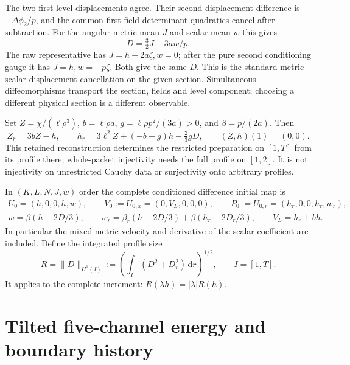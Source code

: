 \documentclass[11pt]{article}
\newcommand{\dd}{\mathrm d}
\newcommand{\norm}[1]{\lVert #1\rVert}
\begin{document}
The two first level displacements agree. Their second displacement
difference is $-\Delta\phi_2/p$, and the common first-field determinant
quadratics cancel after subtraction. For the angular metric mean $J$ and
scalar mean $w$ this gives
\begin{equation}
 D=\tfrac32J-3aw/p.
 \label{eq:D}
\end{equation}
The raw representative has $J=h+2a\zeta,w=0$; after the pure second
conditioning gauge it has $J=h,w=-p\zeta$. Both give the same $D$.
This is the standard metric--scalar displacement cancellation on the
given section. Simultaneous diffeomorphisms transport the section, fields
and level component; choosing a different physical section is a different
observable.

Set $Z=\chi/(\ell\rho^3)$, $b=\ell\rho a$,
$g=\ell\rho p^2/(3a)>0$, and $\beta=p/(2a)$. Then
\begin{equation}
 Z_r=3bZ-h,\qquad
 h_r=3\ell^2Z+(-b+g)h-\tfrac23gD,\qquad (Z,h)(1)=(0,0).
 \label{eq:reconstruct}
\end{equation}
This retained reconstruction determines the restricted preparation on
$[1,T]$ from its profile there; whole-packet injectivity needs the full
profile on $[1,2]$. It is not injectivity on unrestricted Cauchy data or
surjectivity onto arbitrary profiles.

In $(K,L,N,J,w)$ order the complete conditioned difference initial map is
\begin{gather}
 U_0=(h,0,0,h,w),\qquad V_0:=U_{0,x}=(0,V_L,0,0,0),\qquad
 P_0:=U_{0,r}=(h_r,0,0,h_r,w_r),\nonumber\\
 w=\beta(h-2D/3),\qquad
 w_r=\beta_r(h-2D/3)+\beta(h_r-2D_r/3),\qquad V_L=h_r+bh.
 \label{eq:initialmap}
\end{gather}
In particular the mixed metric velocity and derivative of the scalar
coefficient are included. Define the integrated profile size
\begin{equation}
 R=\norm{D}_{H^1(I)}
   :=\left(\int_I(D^2+D_r^2)\,\dd r\right)^{1/2},
 \qquad I=[1,T].
 \label{eq:R}
\end{equation}
It applies to the complete increment: $R(\lambda h)=|\lambda|R(h)$.

\section{Tilted five-channel energy and boundary history}\label{sec:energy}
\end{document}
